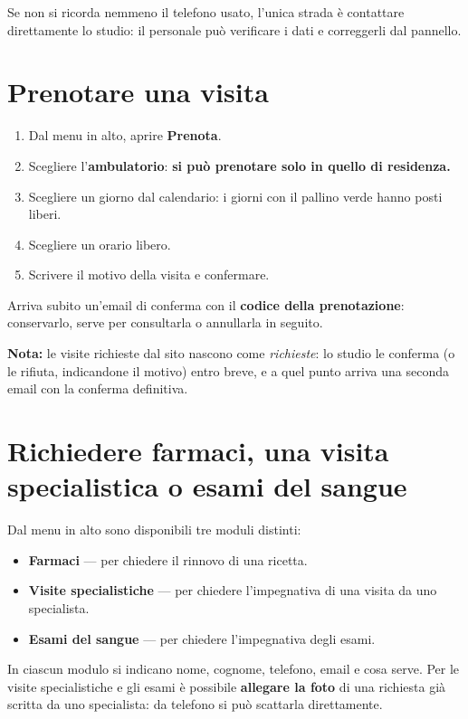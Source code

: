 \documentclass[11pt,a4paper]{article}
\newcommand{\schermata}[1]{\textbf{\color{studioteal}#1}}
\begin{document}
Se non si ricorda nemmeno il telefono usato, l'unica strada è contattare direttamente lo studio: il personale può verificare i dati e correggerli dal pannello.

\section{Prenotare una visita}

\begin{enumerate}
  \item Dal menu in alto, aprire \schermata{Prenota}.
  \item Scegliere l'\textbf{ambulatorio}: \textbf{si può prenotare solo in quello di residenza.}
  \item Scegliere un giorno dal calendario: i giorni con il pallino verde hanno posti liberi.
  \item Scegliere un orario libero.
  \item Scrivere il motivo della visita e confermare.
\end{enumerate}

Arriva subito un'email di conferma con il \textbf{codice della prenotazione}: conservarlo, serve per consultarla o annullarla in seguito.

\textbf{Nota:} le visite richieste dal sito nascono come \emph{richieste}: lo studio le conferma (o le rifiuta, indicandone il motivo) entro breve, e a quel punto arriva una seconda email con la conferma definitiva.

\section{Richiedere farmaci, una visita specialistica o esami del sangue}

Dal menu in alto sono disponibili tre moduli distinti:

\begin{itemize}
  \item \schermata{Farmaci} --- per chiedere il rinnovo di una ricetta.
  \item \schermata{Visite specialistiche} --- per chiedere l'impegnativa di una visita da uno specialista.
  \item \schermata{Esami del sangue} --- per chiedere l'impegnativa degli esami.
\end{itemize}

In ciascun modulo si indicano nome, cognome, telefono, email e cosa serve. Per le visite specialistiche e gli esami è possibile \textbf{allegare la foto} di una richiesta già scritta da uno specialista: da telefono si può scattarla direttamente.
\end{document}
